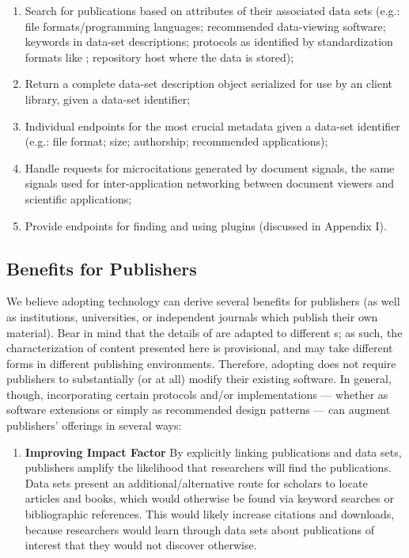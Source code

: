 \documentclass[12pt,letterpaper]{article}
\newcommand{\ATexttclr}[1]{\textcolor{tcolor}{\textbf{#1}}}
\newcommand{\API}{\resizebox{!}{8pt}{\AcronymText{API}}}
\newcommand{\textscc}[1]{{\color{orr!35!black}{{%
{\textsc{\textbf{#1}}}}}}}
\newcommand{\AcronymText}[1]{{\textscc{#1}}}
\newcommand{\SDRM}{\resizebox{!}{8pt}{\ATexttclr{SDRM}}}
\newcommand{\SDRF}{\resizebox{!}{8pt}{\ATexttclr{S}}\resizebox{!}{8pt}{\ATexttclr{DR%
\hspace{1pt}{\raisebox{-1pt}{\fontfamily{qhv}\fontseries{b}\selectfont{}\Large{F}}%
}}}}
\newcommand{\MIBBI}{\resizebox{!}{8pt}{\AcronymText{MIBBI}}}
\newcommand{\p}[1]{

\vspace{.7em}#1}
\begin{document}
{{\begin{description}
\begin{itemize}
\begin{enumerate}[itemsep=5pt]
\item{}  Search for publications based on attributes of their associated data sets (e.g.: file formats/programming languages; recommended data-viewing software; keywords in data-set descriptions; protocols as identified by standardization formats like \MIBBI{}; repository host where the data is stored);

\item{}  Return a complete data-set description object serialized for use by an \API{} client library, given a data-set identifier;

\item{}  Individual \API{} endpoints for the most crucial metadata given a data-set identifier (e.g.: file format; size; authorship; recommended applications);

\item{}  Handle requests for microcitations generated by document signals, the same signals used for inter-application networking between document viewers and scientific applications;

\item{}  Provide \API{} endpoints for finding and using plugins (discussed in Appendix I).
\end{enumerate}
\end{itemize}

\end{description}
}

\subsection{Benefits for Publishers}
\p{We believe adopting \SDRF{} technology can derive several 
benefits for publishers (as well as institutions, 
universities, or independent journals which publish their 
own material).  Bear in mind that the details of \SDRF{} 
are adapted to different \SDRM{}s; as such, the characterization 
of \SDRF{} content presented here is provisional, and may 
take different forms in different publishing environments.  
Therefore, adopting \SDRF{} does not require publishers 
to substantially (or at all) modify their existing software.  
In general, though, incorporating certain \SDRF{} 
protocols and/or implementations --- whether as software 
extensions or simply as recommended design patterns --- 
can augment publishers' offerings in several ways:

\begin{enumerate}[itemsep=3pt, leftmargin=20pt]
\item{}  \textbf{Improving Impact Factor} \hspace{12pt}  By 
explicitly linking publications and data sets, publishers 
amplify the likelihood that researchers will find 
the publications.  Data sets present an additional/alternative 
route for scholars to locate articles and books, 
which would otherwise be found via keyword searches 
or bibliographic references.  This would likely increase 
citations and downloads, because researchers would learn 
through data sets about publications of interest that 
they would not discover otherwise.  
 

\end{enumerate}}}
\end{document}
